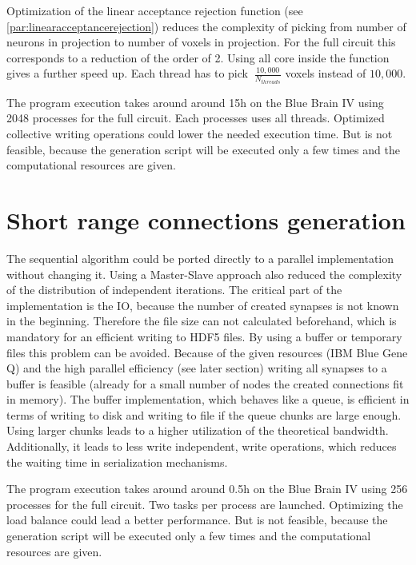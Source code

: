 Optimization of the linear acceptance rejection function (see \ref{par:linearacceptancerejection})
reduces the complexity of picking from number of neurons in projection to number of voxels in projection.
For the full circuit this corresponds to a reduction of the order of 2.
Using all core inside the function gives a further speed up.
Each thread has to pick $~\frac{10,000}{N_{threads}}$ voxels instead of
$10,000$.

The program execution takes around around 15h on the Blue Brain IV using 2048 processes for the full circuit.
Each processes uses all threads. Optimized collective writing operations could 
lower the needed execution time.
But is not feasible, because the generation script will be executed only a few times
and the computational resources are given.



\section{Short range connections generation}
The sequential algorithm could be ported directly to a parallel implementation without changing it.
Using a Master-Slave approach also reduced the complexity of the distribution of independent iterations.
The critical part of the implementation is the IO, because the number of created synapses is not known in the beginning.
Therefore the file size can not calculated beforehand, which is mandatory for an efficient writing to HDF5 files. 
By using a buffer or temporary files this problem can be avoided.
Because of the given resources (IBM Blue Gene Q) and the high parallel efficiency (see later section)
writing all synapses to a buffer is feasible (already for a small number of nodes the created connections fit in memory).
The buffer implementation, which behaves like a queue, is efficient in terms of writing to disk and writing to file
if the queue chunks are large enough. Using larger chunks leads to 
a higher utilization of the theoretical bandwidth. Additionally, it leads to less write independent,
write operations, which reduces the waiting time in serialization mechanisms.

The program execution takes around around 0.5h on the Blue Brain IV using 256 processes for the full circuit.
Two tasks per process are launched. Optimizing the load balance could lead a better performance.
But is not feasible, because the generation script will be executed only a few times
and the computational resources are given.


